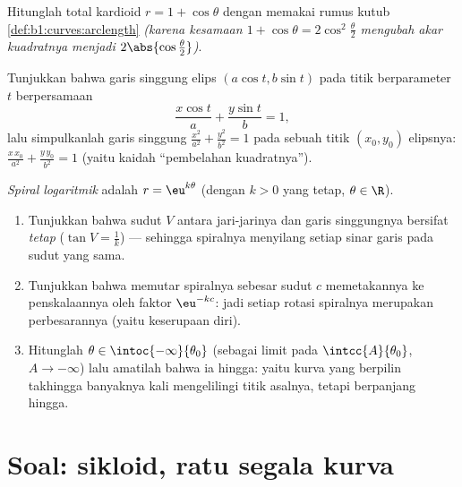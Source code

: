 \begin{exercise}[$\star\star$]\label{exo:b1:curves:10}
Hitunglah  total kardioid $r = 1 + \cos\theta$
dengan memakai rumus kutub \cref{def:b1:curves:arclength}
\emph{(karena kesamaan $1 + \cos\theta = 2\cos^2\frac\theta2$ mengubah
akar kuadratnya menjadi $2\abs{\cos\frac\theta2}$)}.
\end{exercise}

\begin{exercise}[$\star\star$]\label{exo:b1:curves:11}
Tunjukkan bahwa garis singgung elips $(a\cos t, b\sin t)$ pada
titik berparameter $t$ berpersamaan
\[
\frac{x\cos t}{a} + \frac{y\sin t}{b} = 1 ,
\]
lalu simpulkanlah garis singgung $\frac{x^2}{a^2} + \frac{y^2}{b^2} = 1$
pada sebuah titik $(x_0, y_0)$ elipsnya: $\frac{x\,x_0}{a^2} +
\frac{y\,y_0}{b^2} = 1$ (yaitu kaidah ``pembelahan kuadratnya'').
\end{exercise}

\begin{exercise}[$\star\star\star$]\label{exo:b1:curves:12}
\emph{Spiral logaritmik} adalah  $r =
\eu^{k\theta}$ (dengan $k > 0$ yang tetap, $\theta \in \R$).
\begin{enumerate}
  \item Tunjukkan bahwa sudut $V$ antara jari-jarinya dan
        garis singgungnya bersifat \emph{tetap} ($\tan V = \frac1k$) --- sehingga
        spiralnya menyilang setiap sinar garis pada sudut yang sama.
  \item Tunjukkan bahwa memutar spiralnya sebesar sudut $c$ memetakannya
        ke penskalaannya oleh faktor $\eu^{-kc}$: jadi setiap
        rotasi spiralnya merupakan perbesarannya
        (yaitu keserupaan diri).
  \item Hitunglah  $\theta \in
        \intoc{-\infty}{\theta_0}$ (sebagai limit  pada
        $\intcc{A}{\theta_0}$, $A \to -\infty$) lalu amatilah bahwa
        ia hingga: yaitu kurva yang berpilin takhingga banyaknya kali
        mengelilingi titik asalnya, tetapi berpanjang hingga.
\end{enumerate}
\end{exercise}

\section{Soal: sikloid, ratu segala kurva}

